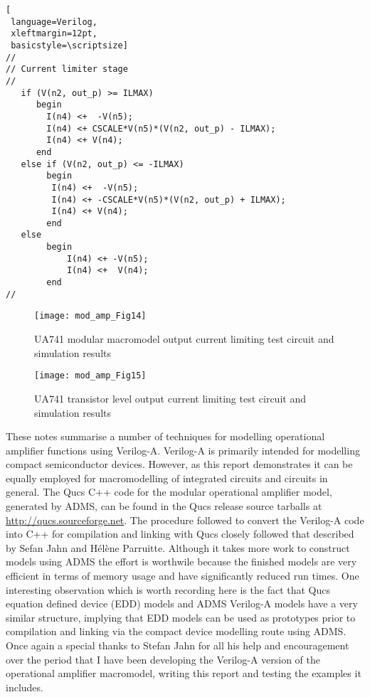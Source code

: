 \begin{lstlisting}[
 language=Verilog, 
 xleftmargin=12pt,
 basicstyle=\scriptsize]
//
// Current limiter stage
//
   if (V(n2, out_p) >= ILMAX) 
      begin
        I(n4) <+  -V(n5);
        I(n4) <+ CSCALE*V(n5)*(V(n2, out_p) - ILMAX);
        I(n4) <+ V(n4);
      end
   else if (V(n2, out_p) <= -ILMAX)
        begin
         I(n4) <+  -V(n5);
         I(n4) <+ -CSCALE*V(n5)*(V(n2, out_p) + ILMAX);
         I(n4) <+ V(n4);
        end
   else
        begin
            I(n4) <+ -V(n5);
            I(n4) <+  V(n4);
        end
//
\end{lstlisting}

\begin{figure} [here]
  \centering
  \texttt{[image: mod\_amp\_Fig14]}
  \caption{UA741 modular macromodel output current limiting test circuit and simulation results}
  \label{fig:mod_amp14}
\end{figure} 


\begin{figure} [here]
  \centering
  \texttt{[image: mod\_amp\_Fig15]}
  \caption{UA741 transistor level output current limiting test circuit and simulation results}
  \label{fig:mod_amp15}
\end{figure} 



These notes summarise a number of techniques for modelling operational
amplifier functions using Verilog-A.  Verilog-A is primarily intended
for modelling compact semiconductor devices.  However, as this report
demonstrates it can be equally employed for macromodelling of
integrated circuits and circuits in general. The Qucs C++ code for the
modular operational amplifier model, generated by ADMS, can be found
in the Qucs release source tarballs at
\url{http://qucs.sourceforge.net}.  The procedure followed to convert
the Verilog-A code into C++ for compilation and linking with Qucs
closely followed that described by Sefan Jahn and H\'{e}l\`{e}ne
Parruitte.  Although it takes more work to construct models using ADMS
the effort is worthwile because the finished models are very efficient
in terms of memory usage and have significantly reduced run times. One
interesting observation which is worth recording here is the fact that
Qucs equation defined device (EDD) models and ADMS Verilog-A models
have a very similar structure, implying that EDD models can be used as
prototypes prior to compilation and linking via the compact device
modelling route using ADMS. Once again a special thanks to Stefan Jahn
for all his help and encouragement over the period that I have been
developing the Verilog-A version of the operational amplifier
macromodel, writing this report and testing the examples it includes.
